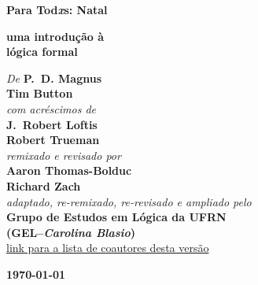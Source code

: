 

\pagestyle{empty}

\vspace*{80pt}

\begin{raggedleft}
\fontsize{30pt}{24pt}\sffamily
\selectfont
  \textbf{Para Tod{\fontsize{37pt}{24pt}\selectfont\rmfamily\textit{x}}s:
  Natal}

\medskip\fontsize{18pt}{20pt}\selectfont

\textbf{uma introdução à\\ lógica formal}





\vfill
\fontsize{12pt}{16pt}\selectfont \textit{De } \textbf{P.~D. Magnus}\\
\textbf{Tim Button}\\
\textit{com acréscimos de}\\
\textbf{J.~Robert Loftis}\\
\textbf{Robert Trueman}\\
\textit{remixado e revisado por}\\
\textbf{Aaron Thomas-Bolduc}\\ \textbf{Richard Zach}\\
\textit{adaptado, re-remixado, re-revisado e ampliado  pelo}\\ \textbf{Grupo de Estudos em Lógica da UFRN \\ (GEL--\textit{Carolina Blasio})}\\
\href{https://gelogica.weebly.com/para-todxs-natal.html}{{\small link para a lista de coautores desta versão}}

\vfill
\textbf{\today}\par
\end{raggedleft}


\newpage

\thispagestyle{empty}
\onecolumn
\ 
\vfill

